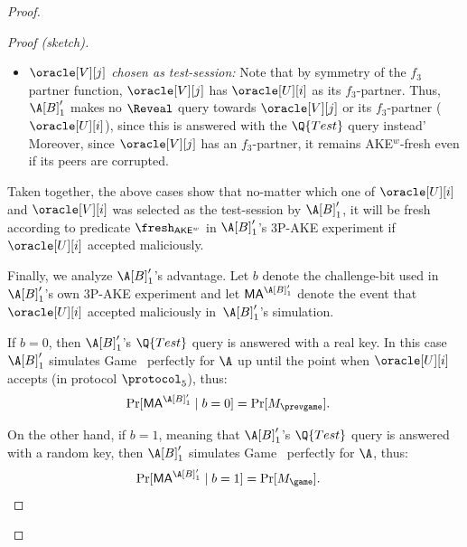 \begin{proof}
\begin{proof}[Proof (sketch)]
\begin{itemize}
	
	
	
	\item \emph{$\oracle[V][j]$ chosen as test-session:}
	Note that by symmetry of the $f_3$ partner function,
	$\oracle[V][j]$ has $\oracle[U][i]$ as its $f_3$-partner.
	Thus, $\A[B]'_1$ makes no $\Reveal$ query towards $\oracle[V][j]$ or its $f_3$-partner ($\oracle[U][i]$),
	since this is answered with the $\Q{Test}$ query instead'
	Moreover,
	since $\oracle[V][j]$ has an $f_3$-partner,
	it remains AKE$^w$-fresh even if its peers are corrupted.




\end{itemize}

Taken together,
the above cases show that no-matter which one of $\oracle[U][i]$ and $\oracle[V][i]$ was selected as the test-session by $\A[B]'_1$,
it will be fresh according to predicate $\fresh_{\mathsf{AKE}^w}$ in $\A[B]'_1$'s 3P-AKE experiment if $\oracle[U][i]$ accepted maliciously.

\medskip

Finally,
we analyze $\A[B]'_1$'s advantage.
Let $b$ denote the challenge-bit used in $\A[B]'_1$'s own 3P-AKE experiment
and let $\mathsf{MA}^{\A[B]'_1}$ denote the event that $\oracle[U][i]$ accepted maliciously in~$\A[B]'_1$'s simulation.



If $b=0$,
then $\A[B]'_1$'s $\Q{Test}$ query is answered with a real key.
In this case $\A[B]'_1$ simulates Game~\prevgame{} perfectly for $\A$ up until the point when $\oracle[U][i]$ accepts (in protocol $\protocol_5$),
thus:
\begin{align}\label{eq:proof:p5:EA:swap_keys_p3:MA_b=0}
	\Pr[\mathsf{MA}^{\A[B]'_1} \mid b = 0] &= \Pr[M_{\prevgame}] .
\end{align}


On the other hand,
if $b=1$,
meaning that $\A[B]'_1$'s $\Q{Test}$ query is answered with a random key,
then $\A[B]'_1$ simulates Game~\game{} perfectly for $\A$,
thus:
\begin{align}\label{eq:proof:p5:EA:swap_keys_p3:MA_b=1}
	\Pr[\mathsf{MA}^{\A[B]'_1} \mid b = 1] &= \Pr[M_{\game}] . 
\end{align}


\end{proof}
\end{proof}
